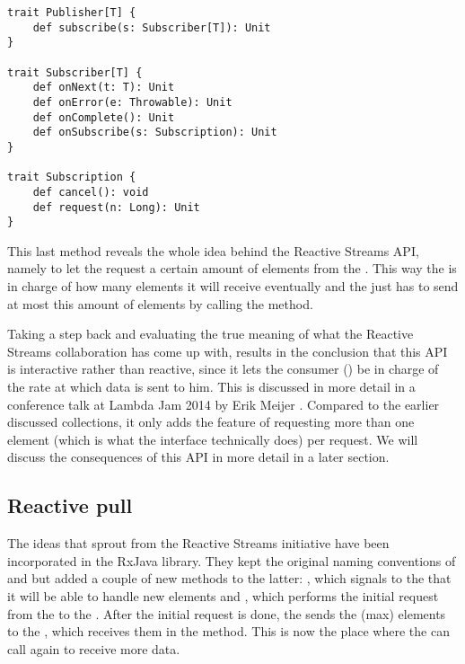 \begin{lstlisting}[caption={Publisher, Subscriber and Subscription}, label={lst:pub-sub}]
trait Publisher[T] {
    def subscribe(s: Subscriber[T]): Unit
}

trait Subscriber[T] {
    def onNext(t: T): Unit
    def onError(e: Throwable): Unit
    def onComplete(): Unit
    def onSubscribe(s: Subscription): Unit
}

trait Subscription {
    def cancel(): void
    def request(n: Long): Unit
}
\end{lstlisting}

This last method reveals the whole idea behind the Reactive Streams API, namely to let the  request a certain amount of elements from the . This way the  is in charge of how many elements it will receive eventually and the  just has to send at most this amount of elements by calling the  method.

Taking a step back and evaluating the true meaning of what the Reactive Streams collaboration has come up with, results in the conclusion that this API is interactive rather than reactive, since it lets the consumer () be in charge of the rate at which data is sent to him. This is discussed in more detail in a conference talk at Lambda Jam 2014 by Erik Meijer . Compared to the earlier discussed \itb collections, it only adds the feature of requesting more than one element (which is what the \itb interface technically does) per request. We will discuss the consequences of this API in more detail in a later section. \todo{}

\subsection{Reactive pull}
The ideas that sprout from the Reactive Streams initiative have been incorporated in the RxJava library. They kept the original naming conventions of \obs and \obv but added a couple of new methods to the latter: , which signals to the \obs that it will be able to handle  new elements and , which performs the initial request from the \obv to the \obs. After the initial request is done, the \obs sends the (max)  elements to the \obv, which receives them in the  method. This is now the place where the \obv can call  again to receive more data.

